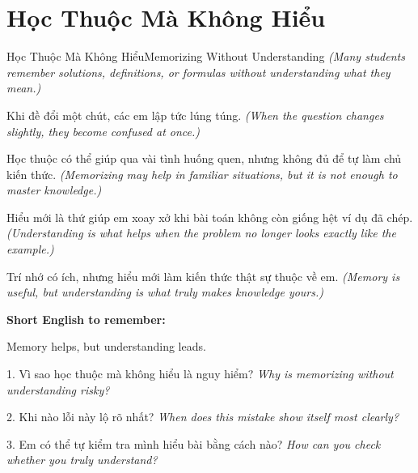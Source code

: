 \section{Học Thuộc Mà Không Hiểu}
\begin{truyen}{Học Thuộc Mà Không Hiểu}{Memorizing Without Understanding}
\textit{(Many students remember solutions, definitions, or formulas without understanding what they mean.)}

Khi đề đổi một chút, các em lập tức lúng túng.
\textit{(When the question changes slightly, they become confused at once.)}

Học thuộc có thể giúp qua vài tình huống quen, nhưng không đủ để tự làm chủ kiến thức.
\textit{(Memorizing may help in familiar situations, but it is not enough to master knowledge.)}

Hiểu mới là thứ giúp em xoay xở khi bài toán không còn giống hệt ví dụ đã chép.
\textit{(Understanding is what helps when the problem no longer looks exactly like the example.)}
\end{truyen}

\begin{baihoc}
Trí nhớ có ích, nhưng hiểu mới làm kiến thức thật sự thuộc về em.
\textit{(Memory is useful, but understanding is what truly makes knowledge yours.)}
\end{baihoc}

\begin{ghinhoanh}
\textbf{Short English to remember:}

Memory helps, but understanding leads.

\end{ghinhoanh}

\begin{tuhocnhanh}
1. Vì sao học thuộc mà không hiểu là nguy hiểm? \textit{Why is memorizing without understanding risky?}

2. Khi nào lỗi này lộ rõ nhất? \textit{When does this mistake show itself most clearly?}

3. Em có thể tự kiểm tra mình hiểu bài bằng cách nào? \textit{How can you check whether you truly understand?}
\end{tuhocnhanh}
\ngancach

